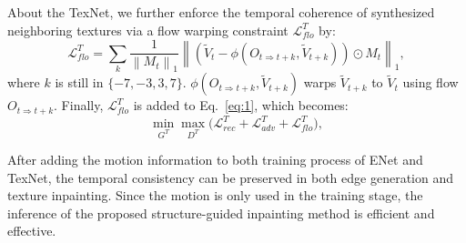 About the TexNet, we further enforce the temporal coherence of synthesized neighboring textures via a flow warping constraint $\mathcal{L}^T_{flo}$ by: 
\begin{equation}
	\label{eq:inp_flow}
		\mathcal{L}^T_{flo}=\sum_{k}\frac{1}{\left\|M_{t} \right\|_1}\left\|(\widetilde{V}_{t}-\phi(O_{t\Rightarrow t+k},\widetilde{V}_{t+k}))\odot M_{t}\right\|_1,
	\end{equation}
	where  $k$ is still in $\{-7,-3, 3, 7\}$. $\phi(O_{t\Rightarrow t+k},\widetilde{V}_{t+k})$ warps $\widetilde{V}_{t+k}$ to $\widetilde{V}_{t}$ using flow $O_{t\Rightarrow t+k}$. Finally, $\mathcal{L}^T_{flo}$ is added to Eq.~\eqref{eq:1}, which becomes:
\begin{equation}
\label{eq:1_}
\min\limits_{G^T} \max \limits_{D^T} \big(\mathcal{L}^{T}_{rec}+\mathcal{L}^T_{adv} +\mathcal{L}^T_{flo}\big),
\end{equation}

After adding the motion information to both training process of ENet and TexNet, the temporal consistency can be preserved in both edge generation and texture inpainting.
Since the motion is only used in the training stage, the inference of the proposed structure-guided inpainting method is efficient and effective.








	